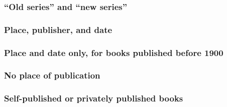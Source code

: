 \documentclass[11pt,letterpaper,oneside]{article}
\begin{document}
\setcounter{subsubsection}{125}
\subsubsection{``Old series'' and ``new series''}
\label{14.126}

\begin{citebib}
\item \cite{boxer1953}
\item \cite{palmatary1950}
\end{citebib}

\subsubsection{Place, publisher, and date}

\begin{citebib}
\item \cite{woolf1927}
\end{citebib}

\subsubsection{Place and date only, for books published before 1900}

\begin{citebib}
\item \cite{goldsmith1766}
\item \cite{cervantes1605}
\end{citebib}

\setcounter{subsubsection}{131}
\subsubsection{No place of publication}

\begin{citebib}
\item \cite{windsor1910}
\item \cite{vliet1890}
\end{citebib}

\setcounter{subsubsection}{136}
\subsubsection{Self-published or privately published books}
\end{document}
